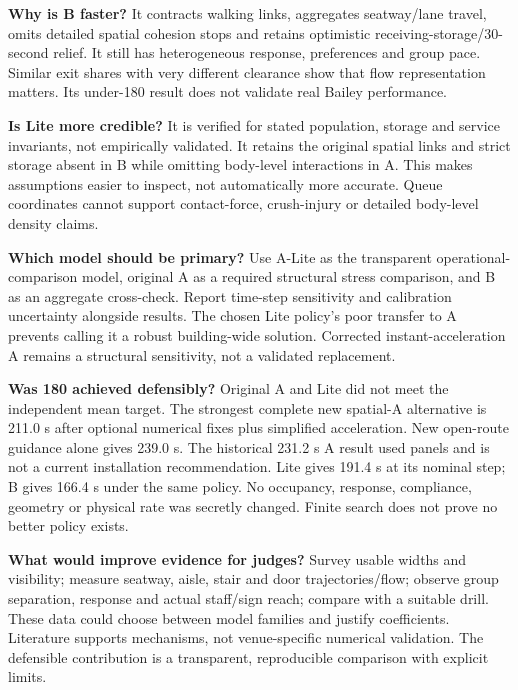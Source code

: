 \documentclass[11pt,a4paper]{article}
\begin{document}
\textbf{Why is B faster?} It contracts walking links, aggregates seatway/lane travel, omits detailed spatial cohesion stops and retains optimistic receiving-storage/30-second relief. It still has heterogeneous response, preferences and group pace. Similar exit shares with very different clearance show that flow representation matters. Its under-180 result does not validate real Bailey performance.


\textbf{Is Lite more credible?} It is verified for stated population, storage and service invariants, not empirically validated. It retains the original spatial links and strict storage absent in B while omitting body-level interactions in A. This makes assumptions easier to inspect, not automatically more accurate. Queue coordinates cannot support contact-force, crush-injury or detailed body-level density claims.


\textbf{Which model should be primary?} Use A-Lite as the transparent operational-comparison model, original A as a required structural stress comparison, and B as an aggregate cross-check. Report time-step sensitivity and calibration uncertainty alongside results. The chosen Lite policy's poor transfer to A prevents calling it a robust building-wide solution. Corrected instant-acceleration A remains a structural sensitivity, not a validated replacement.


\textbf{Was 180 achieved defensibly?} Original A and Lite did not meet the independent mean target. The strongest complete new spatial-A alternative is 211.0 s after optional numerical fixes plus simplified acceleration. New open-route guidance alone gives 239.0 s. The historical 231.2 s A result used panels and is not a current installation recommendation. Lite gives 191.4 s at its nominal step; B gives 166.4 s under the same policy. No occupancy, response, compliance, geometry or physical rate was secretly changed. Finite search does not prove no better policy exists.


\textbf{What would improve evidence for judges?} Survey usable widths and visibility; measure seatway, aisle, stair and door trajectories/flow; observe group separation, response and actual staff/sign reach; compare with a suitable drill. These data could choose between model families and justify coefficients. Literature supports mechanisms, not venue-specific numerical validation. The defensible contribution is a transparent, reproducible comparison with explicit limits.
\end{document}
